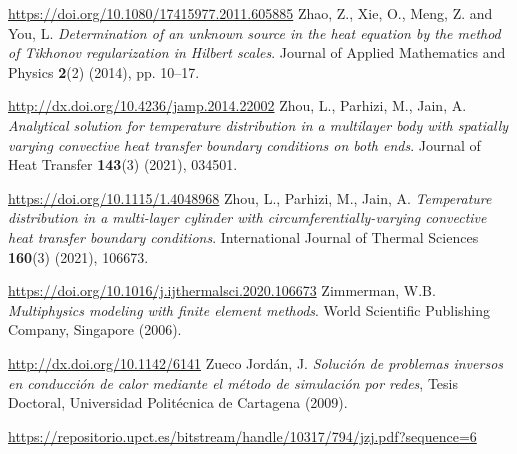 \begin{thebibliography}{301}
\url{https://doi.org/10.1080/17415977.2011.605885}
%
%
 Zhao, Z., Xie, O., Meng, Z. and You, L. {\it Determination of an unknown source in the heat equation by the method of Tikhonov regularization in Hilbert scales}. Journal of Applied Mathematics and Physics {\bf 2}(2) (2014), pp. 10--17.

\url{http://dx.doi.org/10.4236/jamp.2014.22002}
%
%
 Zhou, L., Parhizi, M., Jain, A. {\it Analytical solution for temperature distribution in a multilayer body with spatially varying convective heat transfer boundary conditions on both ends}. Journal of Heat Transfer {\bf 143}(3) (2021), 034501.

\url{https://doi.org/10.1115/1.4048968}
%
%
 Zhou, L., Parhizi, M., Jain, A. {\it Temperature distribution in a multi-layer cylinder with circumferentially-varying convective heat transfer boundary conditions}. International Journal of Thermal Sciences {\bf 160}(3) (2021), 106673.

\url{https://doi.org/10.1016/j.ijthermalsci.2020.106673}
%
%
 Zimmerman, W.B. {\it Multiphysics modeling with finite element methods}. World Scientific Publishing Company, Singapore (2006).

\url{http://dx.doi.org/10.1142/6141}
%
%
 Zueco Jord\'an, J. {\it Soluci\'on de problemas inversos en conducci\'on de calor mediante el m\'etodo de simulaci\'on por redes}, Tesis Doctoral, Universidad Polit\'ecnica de Cartagena (2009).

\url{https://repositorio.upct.es/bitstream/handle/10317/794/jzj.pdf?sequence=6}
%
%

\end{thebibliography}





